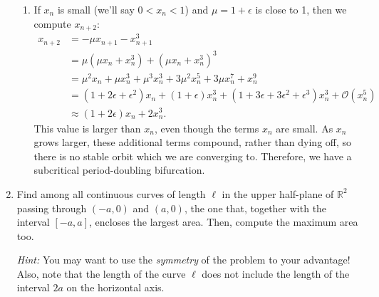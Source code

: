 \documentclass[10pt,letterpaper]{report}
\newcommand{\R}{\mathbb{R}}
\newcommand{\Ord}[1]{\mathcal{O}\left({#1}\right)}
\begin{document}
\begin{enumerate}
\begin{enumerate}
    \item If $x_n$ is small (we'll say $0 < x_n < 1$) and $\mu = 1 + \epsilon$ is close to 1, then we compute $x_{n+2}:$
    \begin{align*}
        x_{n+2} &= -\mu x_{n+1} - x_{n+1}^3 \\
        &= \mu(\mu x_n + x_n^3) + (\mu x_n + x_n^3)^3 \\
        &= \mu^2 x_n + \mu x_n^3 + \mu^3 x_n^3 + 3\mu^2x_n^5 + 3\mu x_n^7 + x_n^9 \\
        &= (1 + 2\epsilon + \epsilon^2) x_n + (1 + \epsilon) x_n^3 + (1 + 3\epsilon + 3\epsilon^2 + \epsilon^3) x_n^3 + \Ord{x_n^5} \\
        &\approx (1+2\epsilon)x_n +2x_n^3.
    \end{align*}
    This value is larger than $x_n$, even though the terms $x_n$ are small. As $x_n$ grows larger, these additional terms compound, rather than dying off, so there is no stable orbit which we are converging to. Therefore, we have a subcritical period-doubling bifurcation.
\end{enumerate}

\item \begin{qbox}
Find among all continuous curves of length $\ell$ in the upper half-plane of $\R^2$ passing through $(-a, 0)$ and $(a, 0)$, the one that, together with the interval $[-a,a]$, encloses the largest area. Then, compute the maximum area too.

\textit{Hint:} You may want to use the \textit{symmetry} of the problem to your advantage! Also, note that the length of the curve $\ell$ does not include the length of the interval $2a$ on the horizontal axis.
\end{qbox}


\end{enumerate}
\end{document}
